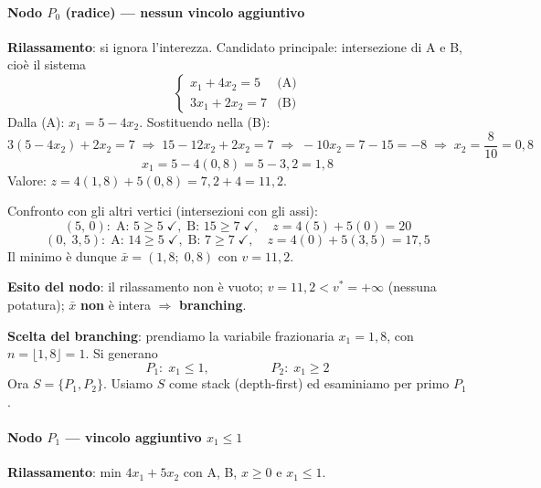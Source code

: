 \documentclass[12pt]{extarticle} %
\begin{document}
\bigskip
\paragraph{Nodo $P_0$ (radice) --- nessun vincolo aggiuntivo}
\textbf{Rilassamento}: si ignora l'interezza. Candidato principale: intersezione di A e B, cioè il sistema
\[
\begin{cases} x_1 + 4x_2 = 5 & \text{(A)}\\ 3x_1 + 2x_2 = 7 & \text{(B)}\end{cases}
\]
Dalla (A): $x_1 = 5 - 4x_2$. Sostituendo nella (B):
\[
3(5 - 4x_2) + 2x_2 = 7
\;\Longrightarrow\; 15 - 12x_2 + 2x_2 = 7
\;\Longrightarrow\; -10x_2 = 7 - 15 = -8
\;\Longrightarrow\; x_2 = \frac{8}{10} = 0{,}8
\]
\[
x_1 = 5 - 4(0{,}8) = 5 - 3{,}2 = 1{,}8
\]
Valore: $z = 4(1{,}8) + 5(0{,}8) = 7{,}2 + 4 = 11{,}2$.

\noindent Confronto con gli altri vertici (intersezioni con gli assi):
\[
(5,\,0):\; \text{A}:\,5 \ge 5\;\checkmark,\; \text{B}:\,15 \ge 7\;\checkmark, \quad z = 4(5) + 5(0) = 20
\]
\[
(0,\;3{,}5):\; \text{A}:\,14 \ge 5\;\checkmark,\; \text{B}:\,7 \ge 7\;\checkmark, \quad z = 4(0) + 5(3{,}5) = 17{,}5
\]
Il minimo è dunque $\bar{x} = (1{,}8;\; 0{,}8)$ con $v = 11{,}2$.

\textbf{Esito del nodo}: il rilassamento non è vuoto; $v = 11{,}2 < v^* = +\infty$ (nessuna potatura); $\bar{x}$ \textbf{non} è intera $\Rightarrow$ \textbf{branching}.

\textbf{Scelta del branching}: prendiamo la variabile frazionaria $x_1 = 1{,}8$, con $n = \lfloor 1{,}8 \rfloor = 1$. Si generano
\[
P_1: \; x_1 \le 1, \hspace{2cm} P_2: \; x_1 \ge 2
\]
Ora $S = \{P_1, P_2\}$. Usiamo $S$ come stack (depth-first) ed esaminiamo per primo $P_1$.

\bigskip
\paragraph{Nodo $P_1$ --- vincolo aggiuntivo $x_1 \le 1$}
\textbf{Rilassamento}: min $4x_1 + 5x_2$ con A, B, $x \ge 0$ e $x_1 \le 1$.
\end{document}
